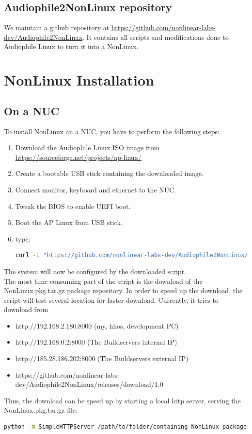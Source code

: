 \documentclass[10pt,a4paper]{article}
\begin{document}
\subsection{Audiophile2NonLinux repository}
We maintain a github repository at \url{https://github.com/nonlinear-labs-dev/Audiophile2NonLinux}. It contains all scripts and modifications done to Audiophile Linux to turn it into a NonLinux. 

\section{NonLinux Installation}
\subsection{On a NUC}
To install NonLinux an a NUC, you have to perform the following steps:
\begin{enumerate}
\item Download the Audiophile Linux ISO image from \url{https://sourceforge.net/projects/ap-linux/}
\item Create a bootable USB stick containing the downloaded image.
\item Connect monitor, keyboard and ethernet to the NUC.
\item Tweak the BIOS to enable UEFI boot.
\item Boot the AP Linux from USB stick.
\item type:
\begin{lstlisting}[language=bash,breaklines=true]
curl -L "https://github.com/nonlinear-labs-dev/Audiophile2NonLinux/raw/master/runme.sh" | sh
\end{lstlisting}
\end{enumerate}
The system will now be configured by the downloaded script.\\
The most time consuming part of the script is the download of the NonLinux.pkg.tar.gz package repository. In order to speed up the download, the script will test several location for faster download. Currently, it tries to download from
\begin{itemize}
\item http://192.168.2.180:8000 (my, hhos, development PC)
\item http://192.168.0.2:8000 (The Buildservers internal IP)
\item http://185.28.186.202:8000 (The Buildservers external IP)
\item https://github.com/nonlinear-labs-dev/Audiophile2NonLinux/releases/download/1.0
\end{itemize}
Thus, the download can be speed up by starting a local http server, serving the NonLinux.pkg.tar.gz file:
\begin{lstlisting}[language=bash,breaklines=true]
python -m SimpleHTTPServer /path/to/folder/containing-NonLinux-package-repository
\end{lstlisting}
\end{document}
